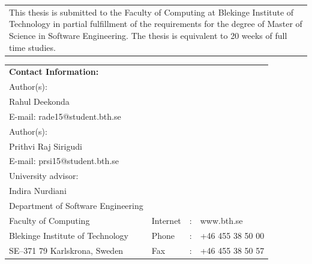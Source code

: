 \documentclass[a4paper,oneside]{bth}
\begin{document}
{\pagestyle{empty}
\changepage{5cm}{1cm}{-0.5cm}{-0.5cm}{}{-2cm}{}{}{}
\noindent%
\begin{tabular}{p{\textwidth}}
{\small This thesis is submitted to the Faculty of Computing at Blekinge Institute
of Technology in partial fulfillment of the requirements for the degree of Master of Science in Software Engineering.
The thesis is equivalent to 20 weeks of full time studies.}
\end{tabular}

\par\vspace {12cm}

\noindent%
\begin{tabular}{p{}lcl}
\textbf{Contact Information:}\\
Author(s):\\
Rahul Deekonda\\
E-mail: rade15@student.bth.se\\
\par\vspace{1cm}
Author(s):\\
Prithvi Raj Sirigudi\\
E-mail: prsi15@student.bth.se\\
\par\vspace {5cm}
University advisor:\\
Indira Nurdiani\\
Department of Software Engineering 
\par\vspace {1cm}
\noindent%
 \\
Faculty of Computing             & Internet & : & www.bth.se \\
Blekinge Institute of Technology & Phone    & : & +46 455 38 50 00 \\
SE--371 79 Karlskrona, Sweden    & Fax      & : & +46 455 38 50 57 \\
\end{tabular}
\clearpage
} %

	\setcounter{page}{1}
    \setcounter{secnumdepth}{3}
\setcounter{tocdepth}{3}
	
\end{document}
